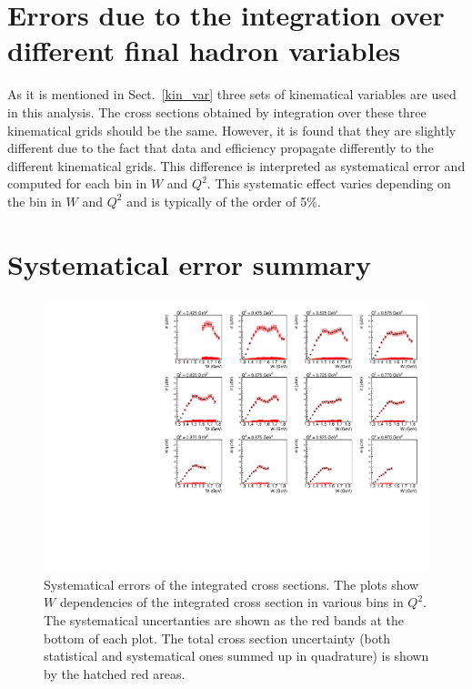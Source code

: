 \section{Errors due to the integration over different final hadron variables}
\label{integr}

As it is mentioned in Sect.~\ref{kin_var} three sets of kinematical variables are used in this analysis. The cross sections obtained by integration over these three kinematical grids should be the same. However, it is found that they are slightly different due to the fact that data and efficiency propagate differently to the different kinematical grids. This difference is interpreted as systematical error and computed for each bin in $W$ and $Q^{2}$. This systematic effect varies depending on the bin in $W$ and $Q^{2}$ and is typically of the order of 5\%.




\section{Systematical error summary}
\label{syssummary}

\begin{figure}[htp]
\begin{center}
\includegraphics[width=15cm]{pictures/sys_err/sys_err_new.pdf}
\caption{\small Systematical errors of the integrated cross sections. The plots show $W$ dependencies of the integrated cross section in various bins in $Q^{2}$. The systematical uncertanties are shown as the red bands at the bottom of each plot. The total cross section uncertainty (both statistical and systematical ones summed up in quadrature) is shown by the hatched red areas.}
\label{fig:sys_err}

\end{center}
\end{figure}

